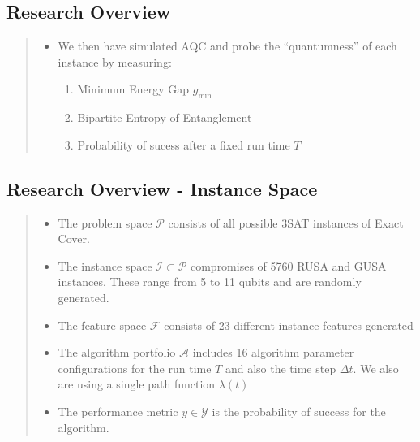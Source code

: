 \documentclass[
]{article}
\providecommand{\tightlist}{%
  \setlength{\itemsep}{0pt}\setlength{\parskip}{0pt}}
\begin{document}
\hypertarget{research-overview-2}{%
\subsection{Research Overview}\label{research-overview-2}}

\begin{quote}
\begin{itemize}
\tightlist
\item
  We then have simulated AQC and probe the ``quantumness'' of each
  instance by measuring:

  \begin{enumerate}
  \def\labelenumi{\arabic{enumi}.}
  \tightlist
  \item
    Minimum Energy Gap \(g_{\text{min}}\)
  \item
    Bipartite Entropy of Entanglement
  \item
    Probability of sucess after a fixed run time \(T\)
  \end{enumerate}
\end{itemize}
\end{quote}

\hypertarget{research-overview---instance-space}{%
\subsection{Research Overview - Instance
Space}\label{research-overview---instance-space}}

\begin{quote}
\begin{itemize}
\tightlist
\item
  The problem space \(\mathcal{P}\) consists of all possible 3SAT
  instances of Exact Cover.
\item
  The instance space \(\mathcal{I} \subset \mathcal{P}\) compromises of
  5760 RUSA and GUSA instances. These range from 5 to 11 qubits and are
  randomly generated.
\item
  The feature space \(\mathcal{F}\) consists of 23 different instance
  features generated
\item
  The algorithm portfolio \(\mathcal{A}\) includes 16 algorithm
  parameter configurations for the run time \(T\) and also the time step
  \(\Delta t\). We also are using a single path function \(\lambda(t)\)
\item
  The performance metric \(y \in \mathcal{Y}\) is the probability of
  success for the algorithm.
\end{itemize}
\end{quote}
\end{document}
